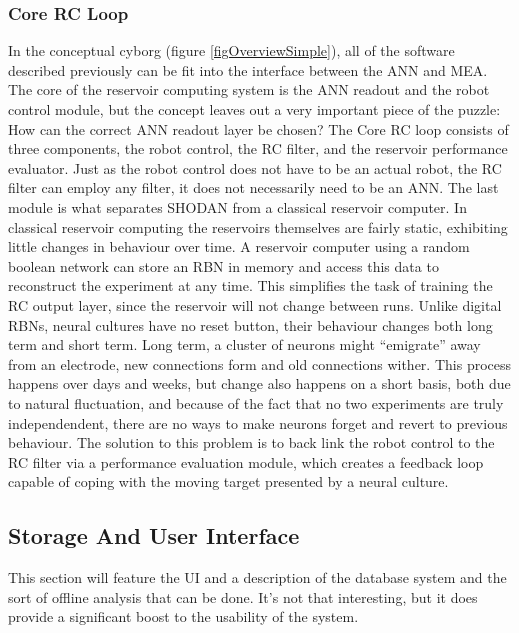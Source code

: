\subsubsection{Core RC Loop}
In the conceptual cyborg (figure \ref{figOverviewSimple}), all of the software
described previously can be fit into the interface between the ANN and MEA.
The core of the reservoir computing system is the ANN readout and the robot
control module, but the concept leaves out a very important piece of the puzzle:
How can the correct ANN readout layer be chosen?
The Core RC loop consists of three components, the robot control, the RC
filter, and the reservoir performance evaluator.
Just as the robot control does not have to be an actual robot, the RC filter
can employ any filter, it does not necessarily need to be an ANN.
The last module is what separates SHODAN from a classical reservoir computer.
In classical reservoir computing the reservoirs themselves are fairly static,
exhibiting little changes in behaviour over time.
A reservoir computer using a random boolean network can store an RBN in memory
and access this data to reconstruct the experiment at any time.
This simplifies the task of training the RC output layer, since the reservoir
will not change between runs.
Unlike digital RBNs, neural cultures have no reset button, their behaviour
changes both long term and short term.
Long term, a cluster of neurons might ``emigrate'' away from an electrode, new
connections form and old connections wither.
This process happens over days and weeks, but change also happens on a short
basis, both due to natural fluctuation, and because of the fact that no two
experiments are truly independendent, there are no ways to make neurons forget
and revert to previous behaviour.
The solution to this problem is to back link the robot control to the RC filter
via a performance evaluation module, which creates a feedback loop capable of coping
with the moving target presented by a neural culture.\par
\subsection{Storage And User Interface}
This section will feature the UI and a description of the database system and
the sort of offline analysis that can be done.
It's not that interesting, but it does provide a significant boost to the
usability of the system.
%
